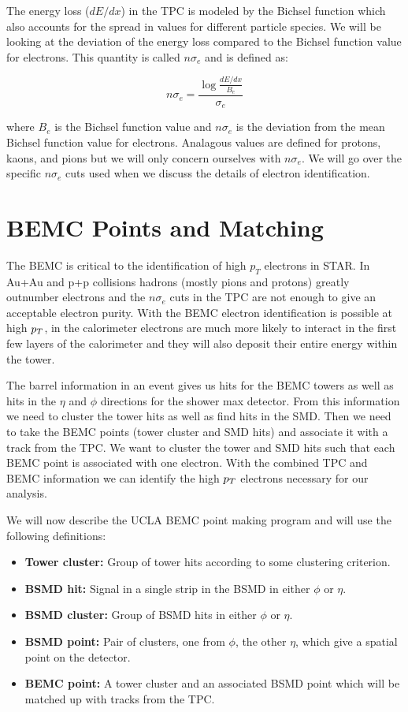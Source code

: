 The energy loss ($dE/dx$) in the TPC is modeled by the Bichsel function which also accounts for the spread in values for different particle species. We will be looking at the deviation of the energy loss compared to the Bichsel function value for electrons. This quantity is called $n\sigma_e$ and is defined as:

\begin{equation}\label{eq:nsigmae}
n\sigma_e = \frac{\log{\frac{dE/dx}{B_e}}}{\sigma_e}
\end{equation}

where $B_e$ is the Bichsel function value and $n\sigma_e$ is the deviation from the mean Bichsel function value for electrons. Analagous values are defined for protons, kaons, and pions but we will only concern ourselves with $n\sigma_e$. We will go over the specific $n\sigma_e$ cuts used when we discuss the details of electron identification. 

\section{BEMC Points and Matching}

The BEMC is critical to the identification of high $p_T$ electrons in STAR. In Au+Au and p+p collisions hadrons (mostly pions and protons) greatly outnumber electrons and the $n\sigma_e$ cuts in the TPC are not enough to give an acceptable electron purity. With the BEMC electron identification is possible at high $p_{T}$, in the calorimeter electrons are much more likely to interact in the first few layers of the calorimeter and they will also deposit their entire energy within the tower. 

The barrel information in an event gives us hits for the BEMC towers as well as hits in the $\eta$ and $\phi$ directions for the shower max detector. From this information we need to cluster the tower hits as well as find hits in the SMD. Then we need to take the BEMC points (tower cluster and SMD hits) and associate it with a track from the TPC. We want to cluster the tower and SMD hits such that each BEMC point is associated with one electron. With the combined TPC and BEMC information we can identify the high $p_{T}$ electrons necessary for our analysis.

We will now describe the UCLA BEMC point making program and will use the following definitions: 

\begin{itemize}
\item \textbf{Tower cluster:} Group of tower hits according to some clustering criterion.
\item \textbf{BSMD hit:} Signal in a single strip in the BSMD in either $\phi$ or $\eta$.
\item \textbf{BSMD cluster:} Group of BSMD hits in either $\phi$ or $\eta$.
\item \textbf{BSMD point:} Pair of clusters, one from $\phi$, the other $\eta$, which give a spatial point on the detector.
\item \textbf{BEMC point:} A tower cluster and an associated BSMD point which will be matched up with tracks from the TPC.
\end{itemize}

